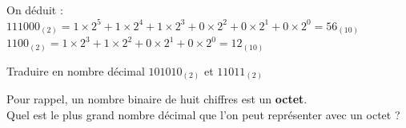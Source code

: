     On déduit : \\
    $ 111000_{(2)} = 1\times 2^5 + 1\times 2^4 + 1\times 2^3 + 0\times 2^2 + 0\times 2^1 + 0\times 2^0 = 56_{(10)}$\\
    $1100_{(2)}= 1\times 2^3 + 1\times 2^2 + 0\times 2^1 + 0\times 2^0 = 12_{(10)} $\\

\begin{Avous}
     Traduire en nombre décimal $101010_{(2)}$ et $11011_{(2)}$\\[2.5cm]
\end{Avous}

\begin{Comprendre}
    Pour rappel, un nombre binaire de huit chiffres est un \textbf{octet}.\\
Quel est le plus grand nombre décimal que l'on peut représenter avec un octet ?\\[2cm]
\end{Comprendre}








